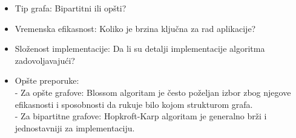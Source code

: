 \documentclass[a4paper]{article}
\theoremstyle{definition}
\begin{document}
\begin{tcolorbox}[width=393pt,colback={myblue},title={Ključna razmatranja za izbor algoritma},colbacktitle=mygray,coltitle=black,boxrule=0.5pt,boxsep=3pt]  
\begin{itemize}  
\item Tip grafa: Bipartitni ili opšti?
\item Vremenska efikasnost: Koliko je brzina ključna za rad aplikacije? 
\item Složenost implementacije: Da li su detalji implementacije algoritma zadovoljavajući?
\item Opšte preporuke:\\
- Za opšte grafove: Blossom algoritam je često poželjan izbor zbog njegove efikasnosti i sposobnosti da rukuje bilo kojom strukturom grafa.\\
- Za bipartitne grafove: Hopkroft-Karp algoritam je generalno brži i jednostavniji za implementaciju.
\end{itemize}
\end{tcolorbox} 
\newpage
\end{document}
